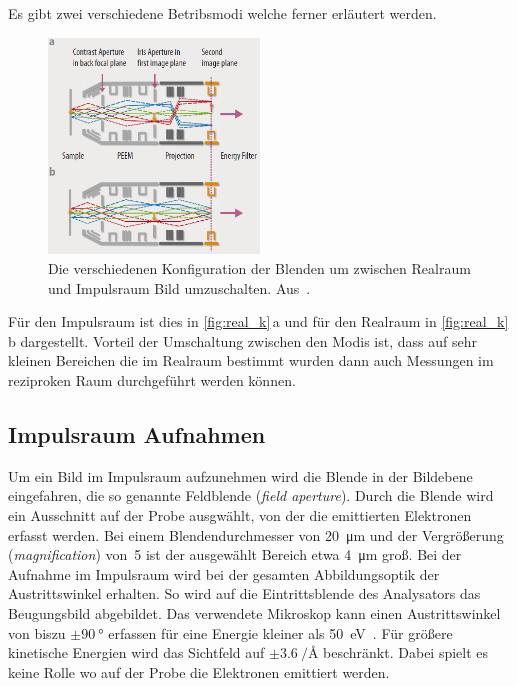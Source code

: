         Es gibt zwei verschiedene Betribsmodi welche ferner erläutert werden.
        \begin{figure}
            \centering
            \includegraphics[width=0.5\textwidth]{Real_k.PNG}
            \caption{Die verschiedenen Konfiguration der Blenden um zwischen Realraum und Impulsraum Bild umzuschalten. Aus~\cite{Focus}.}
            \label{fig:real_k}
        \end{figure}
        Für den Impulsraum ist dies in \autoref{fig:real_k}\,a und für den Realraum in \autoref{fig:real_k}\,b dargestellt.
        Vorteil der Umschaltung zwischen den Modis ist, dass auf sehr kleinen Bereichen die im Realraum bestimmt wurden dann auch Messungen im reziproken Raum durchgeführt werden können.


        \subsection{Impulsraum Aufnahmen}
            Um ein Bild im Impulsraum aufzunehmen wird die Blende in der Bildebene eingefahren, die so genannte Feldblende (\textit{field aperture}).
            Durch die Blende wird ein Ausschnitt auf der Probe ausgwählt, von der die emittierten Elektronen erfasst werden.
            Bei einem Blendendurchmesser von \SI{20}{\micro\meter} und der Vergrößerung (\textit{magnification}) von~\num{5} ist der ausgewählt Bereich etwa \SI{4}{\micro\meter} groß.
            Bei der Aufnahme im Impulsraum wird bei der gesamten Abbildungsoptik der Austrittswinkel erhalten.
            So wird auf die Eintrittsblende des Analysators das Beugungsbild abgebildet.
            Das verwendete Mikroskop kann einen Austrittswinkel von biszu $\pm\SI{90}{\degree}$ erfassen für eine Energie kleiner als \SI{50}{\electronvolt}~\cite{SPECS-MM}.
            Für größere kinetische Energien wird das Sichtfeld auf $\pm\SI[per-mode=reciprocal]{3.6}{\per\angstrom}$ beschränkt.
            Dabei spielt es keine Rolle wo auf der Probe die Elektronen emittiert werden.

